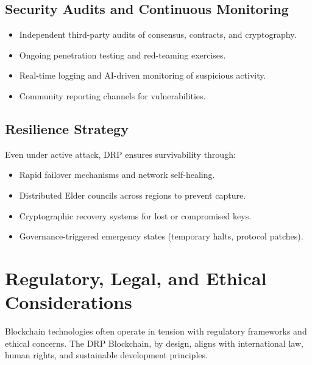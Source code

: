 \documentclass[11pt,a4paper]{article}
\begin{document}
\subsection{Security Audits and Continuous Monitoring}
\begin{itemize}
    \item Independent third-party audits of consensus, contracts, and cryptography.  
    \item Ongoing penetration testing and red-teaming exercises.  
    \item Real-time logging and AI-driven monitoring of suspicious activity.  
    \item Community reporting channels for vulnerabilities.  
\end{itemize}

\subsection{Resilience Strategy}
Even under active attack, DRP ensures survivability through:
\begin{itemize}
    \item Rapid failover mechanisms and network self-healing.  
    \item Distributed Elder councils across regions to prevent capture.  
    \item Cryptographic recovery systems for lost or compromised keys.  
    \item Governance-triggered emergency states (temporary halts, protocol patches).  
\end{itemize}

\section{Regulatory, Legal, and Ethical Considerations}

Blockchain technologies often operate in tension with regulatory frameworks and ethical concerns. The DRP Blockchain, by design, aligns with international law, human rights, and sustainable development principles.
\end{document}
